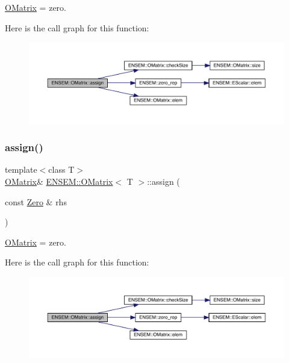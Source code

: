 \mbox{\hyperlink{classENSEM_1_1OMatrix}{O\+Matrix}} = zero. 

Here is the call graph for this function\+:
\nopagebreak
\begin{figure}[H]
\begin{center}
\leavevmode
\includegraphics[width=350pt]{dd/d80/classENSEM_1_1OMatrix_a9b8826edfb36e1bc701a7778424cfe31_cgraph}
\end{center}
\end{figure}
\mbox{\label{classENSEM_1_1OMatrix_a9b8826edfb36e1bc701a7778424cfe31}} 
\subsubsection{\texorpdfstring{assign()}{assign()}\hspace{0.1cm}{\footnotesize\ttfamily [2/6]}}
{\footnotesize\ttfamily template$<$class T$>$ \\
\mbox{\hyperlink{classENSEM_1_1OMatrix}{O\+Matrix}}\& \mbox{\hyperlink{classENSEM_1_1OMatrix}{E\+N\+S\+E\+M\+::\+O\+Matrix}}$<$ T $>$\+::assign (\begin{DoxyParamCaption}\item[{const \mbox{\hyperlink{structENSEM_1_1Zero}{Zero}} \&}]{rhs }\end{DoxyParamCaption})\hspace{0.3cm}{\ttfamily [inline]}}



\mbox{\hyperlink{classENSEM_1_1OMatrix}{O\+Matrix}} = zero. 

Here is the call graph for this function\+:
\nopagebreak
\begin{figure}[H]
\begin{center}
\leavevmode
\includegraphics[width=350pt]{dd/d80/classENSEM_1_1OMatrix_a9b8826edfb36e1bc701a7778424cfe31_cgraph}
\end{center}
\end{figure}
\mbox{\label{classENSEM_1_1OMatrix_af0aaac940f907eb3db104e9f57b90a4f}} 
